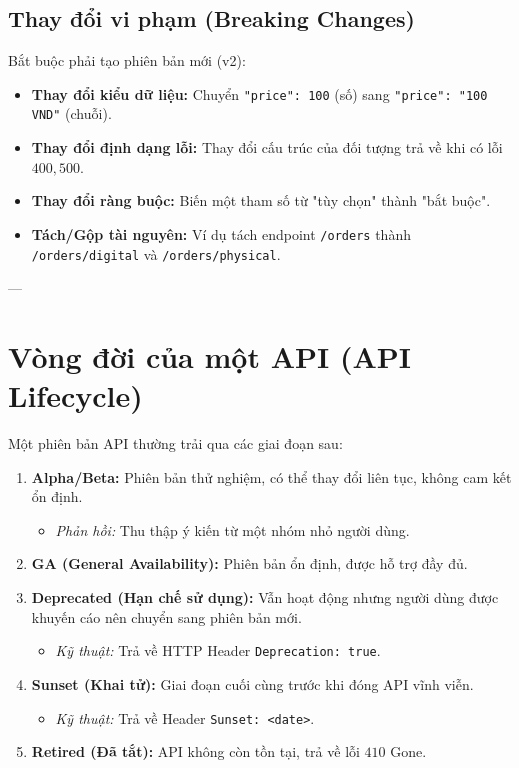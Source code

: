 \documentclass[12pt, a4paper]{article}
\begin{document}
\subsection{Thay đổi vi phạm (Breaking Changes)}
Bắt buộc phải tạo phiên bản mới (v2):
\begin{itemize}
    \item \textbf{Thay đổi kiểu dữ liệu:} Chuyển \texttt{"price": 100} (số) sang \texttt{"price": "100 VND"} (chuỗi).
    \item \textbf{Thay đổi định dạng lỗi:} Thay đổi cấu trúc của đối tượng trả về khi có lỗi $400, 500$.
    \item \textbf{Thay đổi ràng buộc:} Biến một tham số từ "tùy chọn" thành "bắt buộc".
    \item \textbf{Tách/Gộp tài nguyên:} Ví dụ tách endpoint \texttt{/orders} thành \texttt{/orders/digital} và \texttt{/orders/physical}.
\end{itemize}



---

\section{Vòng đời của một API (API Lifecycle)}

Một phiên bản API thường trải qua các giai đoạn sau:

\begin{enumerate}
    \item \textbf{Alpha/Beta:} Phiên bản thử nghiệm, có thể thay đổi liên tục, không cam kết ổn định.
    \begin{itemize}
        \item \textit{Phản hồi:} Thu thập ý kiến từ một nhóm nhỏ người dùng.
    \end{itemize}
    \item \textbf{GA (General Availability):} Phiên bản ổn định, được hỗ trợ đầy đủ.
    \item \textbf{Deprecated (Hạn chế sử dụng):} Vẫn hoạt động nhưng người dùng được khuyến cáo nên chuyển sang phiên bản mới.
    \begin{itemize}
        \item \textit{Kỹ thuật:} Trả về HTTP Header \texttt{Deprecation: true}.
    \end{itemize}
    \item \textbf{Sunset (Khai tử):} Giai đoạn cuối cùng trước khi đóng API vĩnh viễn. 
    \begin{itemize}
        \item \textit{Kỹ thuật:} Trả về Header \texttt{Sunset: <date>}.
    \end{itemize}
    \item \textbf{Retired (Đã tắt):} API không còn tồn tại, trả về lỗi $410$ Gone.
\end{enumerate}
\end{document}
